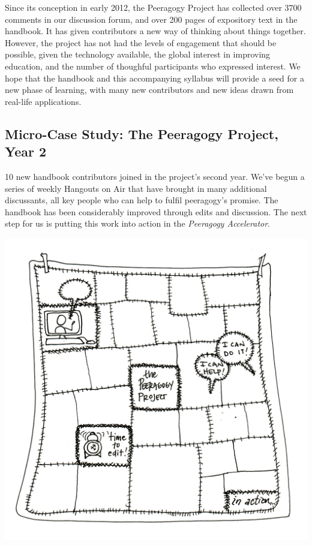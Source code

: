 Since its conception in early 2012, the Peeragogy Project has collected
over 3700 comments in our discussion forum, and over 200 pages of
expository text in the handbook. It has given contributors a new way of
thinking about things together. However, the project has not had the
levels of engagement that should be possible, given the technology
available, the global interest in improving education, and the number of
thoughful participants who expressed interest. We hope that the handbook
and this accompanying syllabus will provide a seed for a new phase of
learning, with many new contributors and new ideas drawn from real-life
applications.

\subsection{Micro-Case Study: The Peeragogy Project, Year 2}

10 new handbook contributors joined in the project's second year.
We've begun a series of weekly Hangouts on Air that have brought in
many additional discussants, all key people who can help to fulfil
peeragogy's promise.  The handbook has been considerably improved
through edits and discussion.  The next step for us is putting this
work into action in the \emph{Peeragogy Accelerator}.

\begin{center}
\includegraphics[width=.6\textwidth]{../pictures/OpenBook-3.jpg}
\end{center}
